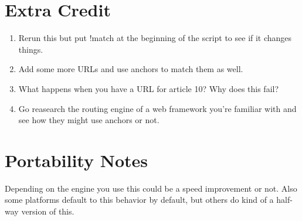 \section{Extra Credit}

\begin{enumerate}
\item Rerun this but put !match at the beginning of the script to see if it
    changes things.
\item Add some more URLs and use anchors to match them as well.
\item What happens when you have a URL for article 10?  Why does this fail?
\item Go reasearch the routing engine of a web framework you're familiar with and
    see how they might use anchors or not.
\end{enumerate}

\section{Portability Notes}

Depending on the engine you use this could be a speed improvement or not.
Also some platforms default to this behavior by default, but others do kind
of a half-way version of this.

